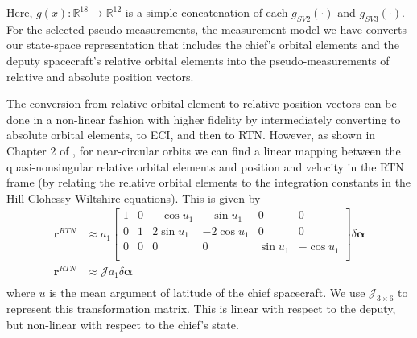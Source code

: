 Here, $g(x):\mathbb{R}^{18} \rightarrow \mathbb{R}^{12}$ is a simple concatenation of each $g_{SV2}(\cdot)$ and $g_{SV3}(\cdot)$. For the selected pseudo-measurements, the measurement model we have converts our state-space representation that includes the chief's orbital elements and the deputy spacecraft's relative orbital elements into the pseudo-measurements of relative and absolute position vectors.

The conversion from relative orbital element to relative position vectors can be done in a non-linear fashion with higher fidelity by intermediately converting to absolute orbital elements, to ECI, and then to RTN. However, as shown in Chapter 2 of \cite{damicothesis}, for near-circular orbits we can find a linear mapping between the quasi-nonsingular relative orbital elements and position and velocity in the RTN frame (by relating the relative orbital elements to the integration constants in the Hill-Clohessy-Wiltshire equations). This is given by
\begin{align}
\boldsymbol{r}^{RTN} &\approx a_1
\begin{bmatrix}
1 & 0 & -\cos u_1 & -\sin u_1 & 0 & 0 \\
0 & 1 & 2\sin u_1 & -2\cos u_1 & 0 & 0 \\
0 & 0 & 0 & 0 & \sin u_1 & -\cos u_1 \\
\end{bmatrix}
\delta \boldsymbol{\alpha} \\
\boldsymbol{r}^{RTN} &\approx 
\mathcal{J}
a_1\delta \boldsymbol{\alpha} \\ \label{eq:J_linear_mapping}
\end{align}
where $u$ is the mean argument of latitude of the chief spacecraft. We use $\mathcal{J}_{3\times 6}$ to represent this transformation matrix. This is linear with respect to the deputy, but non-linear with respect to the chief's state.

